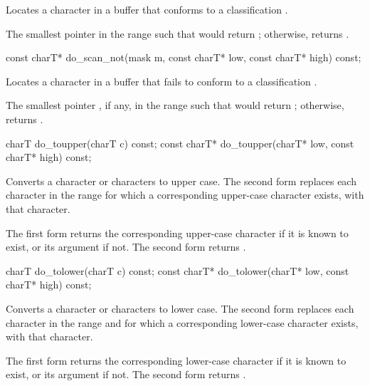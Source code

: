 \begin{itemdescr}
\pnum
\effects
Locates a character in a buffer that conforms to a classification
.

\pnum
\returns
The smallest pointer  in the range
such that
would return
;
otherwise, returns .
\end{itemdescr}

%
\begin{itemdecl}
const charT* do_scan_not(mask m, const charT* low, const charT* high) const;
\end{itemdecl}

\begin{itemdescr}
\pnum
\effects
Locates a character in a buffer that fails to conform to a classification
.

\pnum
\returns
The smallest pointer , if any, in the range
such that
would return
;
otherwise, returns .
\end{itemdescr}

%
\begin{itemdecl}
charT        do_toupper(charT c) const;
const charT* do_toupper(charT* low, const charT* high) const;
\end{itemdecl}

\begin{itemdescr}
\pnum
\effects
Converts a character or characters to upper case.
The second form replaces each character
in the range
for which a corresponding upper-case character exists, with
that character.

\pnum
\returns
The first form returns the corresponding upper-case character if it
is known to exist, or its argument if not.
The second form returns .
\end{itemdescr}

%
\begin{itemdecl}
charT        do_tolower(charT c) const;
const charT* do_tolower(charT* low, const charT* high) const;
\end{itemdecl}

\begin{itemdescr}
\pnum
\effects
Converts a character or characters to lower case.
The second form replaces each character
in the range
and for which a corresponding lower-case character exists,
with that character.

\pnum
\returns
The first form returns the corresponding lower-case character if it
is known to exist, or its argument if not.
The second form returns .
\end{itemdescr}

